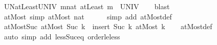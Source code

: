 \begin{isabellebody}
\endisatagproof
{\isafoldproof}%
%
\isadelimproof
\isanewline
%
\endisadelimproof
\isanewline
{}\isamarkupfalse%
\ UN{\isacharunderscore}{\kern0pt}atLeast{\isacharunderscore}{\kern0pt}UNIV{\isacharcolon}{\kern0pt}\ {\isachardoublequoteopen}{\isacharparenleft}{\kern0pt}{\isasymUnion}m{\isacharcolon}{\kern0pt}{\isacharcolon}{\kern0pt}nat{\isachardot}{\kern0pt}\ atLeast\ m{\isacharparenright}{\kern0pt}\ {\isacharequal}{\kern0pt}\ UNIV{\isachardoublequoteclose}\isanewline
%
\isadelimproof
\ \ %
\endisadelimproof
%
\isatagproof
{}\isamarkupfalse%
\ blast%
\endisatagproof
{\isafoldproof}%
%
\isadelimproof
%
\endisadelimproof
%
\isadelimdocument
%
\endisadelimdocument
%
\isatagdocument
%
\isamarkuptrue%
%
\endisatagdocument
{\isafolddocument}%
%
\isadelimdocument
%
\endisadelimdocument
{}\isamarkupfalse%
\ atMost{\isacharunderscore}{\kern0pt}{}\ {\isacharbrackleft}{\kern0pt}simp{\isacharbrackright}{\kern0pt}{\isacharcolon}{\kern0pt}\ {\isachardoublequoteopen}atMost\ {\isacharparenleft}{\kern0pt}{}{\isacharcolon}{\kern0pt}{\isacharcolon}{\kern0pt}nat{\isacharparenright}{\kern0pt}\ {\isacharequal}{\kern0pt}\ {\isacharbraceleft}{\kern0pt}{}{\isacharbraceright}{\kern0pt}{\isachardoublequoteclose}\isanewline
%
\isadelimproof
\ \ %
\endisadelimproof
%
\isatagproof
{}\isamarkupfalse%
\ {\isacharparenleft}{\kern0pt}simp\ add{\isacharcolon}{\kern0pt}\ atMost{\isacharunderscore}{\kern0pt}def{\isacharparenright}{\kern0pt}%
\endisatagproof
{\isafoldproof}%
%
\isadelimproof
\isanewline
%
\endisadelimproof
\isanewline
{}\isamarkupfalse%
\ atMost{\isacharunderscore}{\kern0pt}Suc{\isacharcolon}{\kern0pt}\ {\isachardoublequoteopen}atMost\ {\isacharparenleft}{\kern0pt}Suc\ k{\isacharparenright}{\kern0pt}\ {\isacharequal}{\kern0pt}\ insert\ {\isacharparenleft}{\kern0pt}Suc\ k{\isacharparenright}{\kern0pt}\ {\isacharparenleft}{\kern0pt}atMost\ k{\isacharparenright}{\kern0pt}{\isachardoublequoteclose}\isanewline
%
\isadelimproof
\ \ %
\endisadelimproof
%
\isatagproof
{}\isamarkupfalse%
\ atMost{\isacharunderscore}{\kern0pt}def\ \isamarkupfalse%
\ {\isacharparenleft}{\kern0pt}auto\ simp\ add{\isacharcolon}{\kern0pt}\ less{\isacharunderscore}{\kern0pt}Suc{\isacharunderscore}{\kern0pt}eq\ order{\isacharunderscore}{\kern0pt}le{\isacharunderscore}{\kern0pt}less{\isacharparenright}{\kern0pt}%
\endisatagproof
{\isafoldproof}%
%
\isadelimproof
\isanewline
%
\endisadelimproof
\isanewline
{}\isamarkupfalse%

\end{isabellebody}
